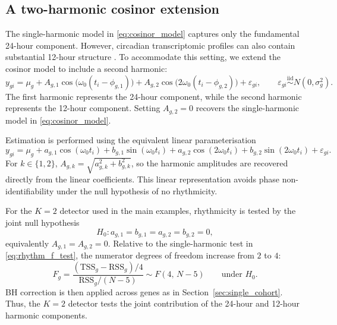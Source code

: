 \documentclass{article}
\begin{document}
\subsection{A two-harmonic cosinor extension}
\label{sec:cosinor_violation}

The single-harmonic model in \eqref{eq:cosinor_model} captures only the
fundamental 24-hour component. However, circadian transcriptomic profiles
can also contain substantial 12-hour structure
\citep{hughes2009harmonics,zhu201712hour}. To accommodate this setting,
we extend the cosinor model to include a second harmonic:
\begin{equation}
y_{gi}
=
\mu_g
+
A_{g,1}\cos \bigl(\omega_0 (t_i - \phi_{g,1})\bigr)
+
A_{g,2}\cos \bigl(2\omega_0 (t_i - \phi_{g,2})\bigr)
+
\varepsilon_{gi},
\qquad
\varepsilon_{gi}\overset{\text{iid}}{\sim}N(0,\sigma_g^2).
\label{eq:twoharm_model}
\end{equation}
The first harmonic represents the 24-hour component, while the second
harmonic represents the 12-hour component. Setting $A_{g,2}=0$ recovers
the single-harmonic model in \eqref{eq:cosinor_model}.

Estimation is performed using the equivalent linear parameterisation
\begin{equation}
y_{gi}
=
\mu_g
+
a_{g,1}\cos(\omega_0 t_i)
+
b_{g,1}\sin(\omega_0 t_i)
+
a_{g,2}\cos(2\omega_0 t_i)
+
b_{g,2}\sin(2\omega_0 t_i)
+
\varepsilon_{gi}.
\label{eq:twoharm_linear}
\end{equation}
For $k\in\{1,2\}$,
$
A_{g,k}=\sqrt{a_{g,k}^2+b_{g,k}^2}
$,
so the harmonic amplitudes are recovered directly from the linear
coefficients. This linear representation avoids phase non-identifiability
under the null hypothesis of no rhythmicity.

For the $K=2$ detector used in the main examples, rhythmicity is tested by
the joint null hypothesis
\[
H_0:
a_{g,1}=b_{g,1}=a_{g,2}=b_{g,2}=0,
\]
equivalently $A_{g,1}=A_{g,2}=0$. Relative to the single-harmonic test in
\eqref{eq:rhythm_f_test}, the numerator degrees of freedom increase from
$2$ to $4$:
\begin{equation}
F_g
=
\frac{(\mathrm{TSS}_g - \mathrm{RSS}_g)/4}
{\mathrm{RSS}_g/(N-5)}
\sim F(4,\,N-5)
\qquad \text{under } H_0 .
\label{eq:twoharm_f_test}
\end{equation}
BH correction is then applied across genes as in
Section~\ref{sec:single_cohort}. Thus, the $K=2$ detector tests the joint
contribution of the 24-hour and 12-hour harmonic components.
\end{document}
